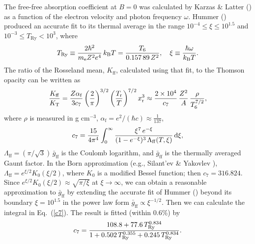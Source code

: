 \documentclass{aa}
\begin{document}
The free-free absorption coefficient
at $B=0$ was calculated
by Karzas \& Latter (\cite{KarzasLatter})
as a function of the electron
velocity and photon frequency $\omega$.
Hummer (\cite{Hummer88}) produced an accurate fit to
its thermal average in the range $10^{-4}\leq \xi \leq 10^{1.5}$ 
and $10^{-3}\leq T_\mathrm{Ry}<10^3$,
where 
%
\begin{equation}
   T_\mathrm{Ry}\equiv {2\hbar^2\over m_\mathrm{e} Z^2 e^4}\,k_\mathrm{B} T = 
     {T_6\over0.157\,89\,Z^2},
\quad
   \xi \equiv{\hbar\omega\over k_\mathrm{B} T}.
\label{TRy}
\end{equation}
%
The ratio of the 
Rosseland mean, $K_\mathrm{ff}$, calculated using that fit,
to the Thomson opacity can be written as
%
\begin{equation}
   {K_\mathrm{ff}\over K_\mathrm{T}} =
    {Z\alpha_\mathrm{f}\over3c_7}\left({2\over\pi}\right)^{3/2}
        \left({T_\mathrm{r}\over T}\right)^{7/2} x_\mathrm{r}^3
      \approx{2\times10^4\over c_7}\,{Z^2\over A}\,
          {\rho\over T_6^{7/2}},
\label{KRcompar}
\end{equation}
where $\rho$ is measured in g cm$^{-3}$, 
$\alpha_\mathrm{f}=e^2/(\hbar c)\approx\frac{1}{137}$,
%
\begin{equation}
   c_7 = {15\over4\pi^4}\int_0^\infty{\xi^7\,e^{-\xi}\over
        (1-e^{-\xi})^3\,\Lambda_\mathrm{ff}(T,\xi)}\,\mathrm{d} \xi,
\label{c7}
\end{equation}
%
$\Lambda_\mathrm{ff}=(\pi/\sqrt{3})\,\bar{g}_\mathrm{ff}$ is the Coulomb
logarithm, and $\bar{g}_\mathrm{ff}$ is the thermally
averaged Gaunt factor.
In the Born approximation
(e.g., Silant'ev \& Yakovlev \cite{SilYak}),
$\Lambda_\mathrm{ff}=e^{\xi/2}K_0(\xi/2)$, where $K_0$ is a modified
Bessel function; then $c_7=316.824$. Since 
$e^{\xi/2}K_0(\xi/2) \approx \sqrt{\pi/\xi}$ at $\xi\to\infty$,
we can obtain a reasonable approximation to $\bar{g}_\mathrm{ff}$
by extending the
accurate fit of Hummer (\cite{Hummer88}) beyond its boundary
$\xi=10^{1.5}$ in the power law form
$\bar{g}_\mathrm{ff}\propto \xi^{-1/2}$.
Then we can calculate the integral in Eq.~(\ref{c7}).
The result is fitted (within 0.6\%) by
%
\begin{equation}
   c_7={108.8+77.6\,T_\mathrm{Ry}^{0.834}
    \over 1+0.502\,T_\mathrm{Ry}^{0.355}+0.245\,T_\mathrm{Ry}^{0.834}}.
\end{equation}
\end{document}
